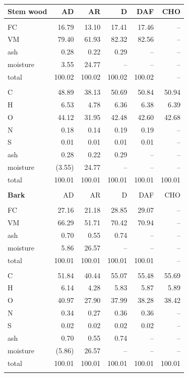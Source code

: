 \begin{longtable}{lrrrrr}
    \textbf{Stem wood} & AD & AR & D & DAF & CHO \\
    \hline \\
    FC       & 16.79  & 13.10  & 17.41  & 17.46  & -- \\
    VM       & 79.40  & 61.93  & 82.32  & 82.56  & -- \\
    ash      & 0.28   & 0.22   & 0.29   & --     & -- \\
    moisture & 3.55   & 24.77  & --     & --     & -- \\
    total    & 100.02 & 100.02 & 100.02 & 100.02 & -- \\
    \\
    C        & 48.89  & 38.13  & 50.69  & 50.84  & 50.94 \\
    H        & 6.53   & 4.78   & 6.36   & 6.38   & 6.39 \\
    O        & 44.12  & 31.95  & 42.48  & 42.60  & 42.68 \\
    N        & 0.18   & 0.14   & 0.19   & 0.19   & -- \\
    S        & 0.01   & 0.01   & 0.01   & 0.01   & -- \\
    ash      & 0.28   & 0.22   & 0.29   & --     & -- \\
    moisture & (3.55) & 24.77  & --     & --     & -- \\
    total    & 100.01 & 100.01 & 100.01 & 100.01 & 100.01 \\
    \\

    \textbf{Bark} & AD & AR & D & DAF & CHO \\
    \hline \\
    FC       & 27.16  & 21.18  & 28.85  & 29.07  & -- \\
    VM       & 66.29  & 51.71  & 70.42  & 70.94  & -- \\
    ash      & 0.70   & 0.55   & 0.74   & --     & -- \\
    moisture & 5.86   & 26.57  & --     & --     & -- \\
    total    & 100.01 & 100.01 & 100.01 & 100.01 & -- \\
    \\
    C        & 51.84  & 40.44  & 55.07  & 55.48  & 55.69 \\
    H        & 6.14   & 4.28   & 5.83   & 5.87   & 5.89 \\
    O        & 40.97  & 27.90  & 37.99  & 38.28  & 38.42 \\
    N        & 0.34   & 0.27   & 0.36   & 0.36   & -- \\
    S        & 0.02   & 0.02   & 0.02   & 0.02   & -- \\
    ash      & 0.70   & 0.55   & 0.74   & --     & -- \\
    moisture & (5.86) & 26.57  & --     & --     & -- \\
    total    & 100.01 & 100.01 & 100.01 & 100.01 & 100.01 \\
    \\


\end{longtable}
